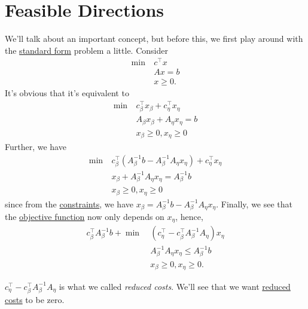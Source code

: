 \section{Feasible Directions}
We'll talk about an important concept, but before this, we first play around with the \hyperref[def:standard-form]{standard form} problem a little. Consider
\begin{align*}
	\min~ & c^{\top}x \\
	      & Ax = b    \\
	      & x\geq 0.
\end{align*}
It's obvious that it's equivalent to
\begin{align*}
	\min~ & c^{\top}_{\beta}x_{\beta} + c^{\top}_{\eta}x_{\eta} \\
	      & A_{\beta}x_{\beta} + A_{\eta}x_{\eta} = b           \\
	      & x_{\beta}\geq 0, x_{\eta}\geq 0
\end{align*}
Further, we have
\begin{align*}
	\min~ & c^{\top}_{\beta}(A^{-1}_{\beta}b - A^{-1}_{\beta}A_{\eta}x_{\eta} ) + c_{\eta}^{\top}x_{\eta} \\
	      & x_{\beta} + A^{-1}_{\beta}A_{\eta}x_{\eta} = A^{-1}_{\beta}b                                  \\
	      & x_{\beta}\geq 0, x_{\eta}\geq 0
\end{align*}
since from the \hyperref[def:constraints]{constraints}, we have \(x_{\beta} = A^{-1}_{\beta}b - A^{-1}_{\beta}A_{\eta}x_{\eta}\). Finally, we see that
the \hyperref[def:objective-function]{objective function} now only depends on \(x_{\eta}\), hence,
\begin{align*}
	c^{\top}_{\beta}A^{-1}_{\beta}b + \min~ & (c_{\eta}^{\top} - c_{\beta}^{\top}A^{-1}_{\beta}A_{\eta})x_{\eta} \\
	                                        & A^{-1}_{\beta}A_{\eta}x_{\eta} \leq A^{-1}_{\beta}b                \\
	                                        & x_{\beta}\geq 0, x_{\eta}\geq 0.
\end{align*}

\begin{note}\label{note:reduced-cost}
	\(c_{\eta}^{\top} - c_{\beta}^{\top}A^{-1}_{\beta}A_{\eta}\) is what we called \emph{reduced costs}.
	We'll see that we want \hyperref[def:reduced-cost]{reduced costs} to be zero.
\end{note}

